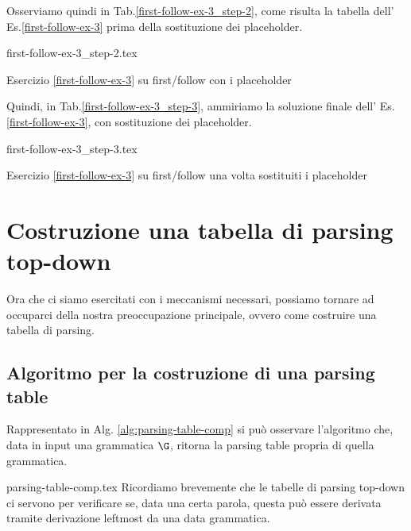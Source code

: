 \documentclass[class=book, crop=false, oneside, 12pt]{standalone}
\begin{document}
Osserviamo quindi in Tab.\ref{first-follow-ex-3_step-2}, come risulta la tabella dell' Es.\ref{first-follow-ex-3} prima della sostituzione dei placeholder.
\begin{table}[H]
	\centering
	{first-follow-ex-3_step-2.tex}
    \caption{Esercizio \ref{first-follow-ex-3} su first/follow con i placeholder}
    \label{first-follow-ex-3_step-2}
\end{table}
Quindi, in Tab.\ref{first-follow-ex-3_step-3}, ammiriamo la soluzione finale dell' Es.\ref{first-follow-ex-3}, con sostituzione dei placeholder.
\begin{table}[H]
	\centering
	{first-follow-ex-3_step-3.tex}
    \caption{Esercizio \ref{first-follow-ex-3} su first/follow una volta sostituiti i placeholder}
    \label{first-follow-ex-3_step-3}
\end{table}

\section{Costruzione una tabella di parsing top-down}
Ora che ci siamo esercitati con i meccanismi necessari, possiamo tornare ad occuparci della nostra preoccupazione principale, ovvero come costruire una tabella di parsing.

\subsection{Algoritmo per la costruzione di una parsing table}
Rappresentato in Alg. \ref{alg:parsing-table-comp} si può osservare l'algoritmo che, data in input una grammatica \(\G\), ritorna la parsing table propria di quella grammatica. 

{parsing-table-comp.tex}
Ricordiamo brevemente che le tabelle di parsing top-down ci servono per verificare se, data una certa parola, questa può essere derivata tramite derivazione leftmost da una data grammatica.
\end{document}
